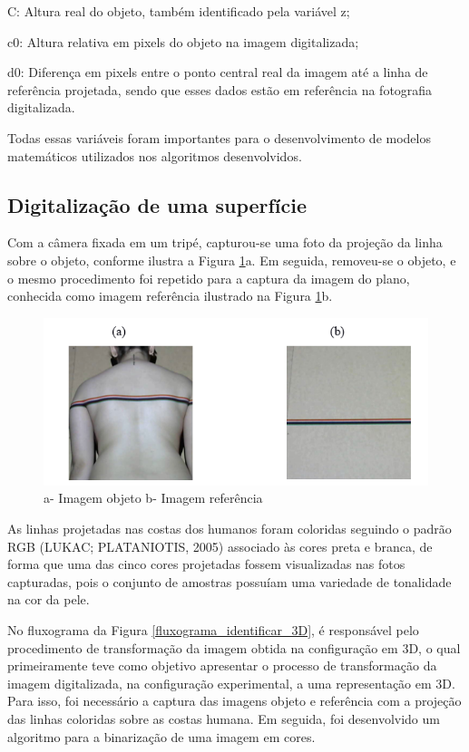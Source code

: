 \documentclass[a4paper, 12pt]{article}
\begin{document}
C: Altura real do objeto, também identificado pela variável z;

c0: Altura relativa em pixels do objeto na imagem digitalizada;

d0: Diferença em pixels entre o ponto central real da imagem até a linha de referência projetada, sendo que esses dados estão em referência na fotografia digitalizada. 
 
Todas essas variáveis foram importantes para o desenvolvimento de modelos matemáticos utilizados nos algoritmos desenvolvidos. 

\subsection{Digitalização de uma superfície}

Com a câmera fixada em um tripé, capturou-se uma foto da projeção da linha sobre o objeto, conforme ilustra a Figura \ref{imagem_projecao_colorida}a. Em seguida, removeu-se o objeto, e o mesmo procedimento foi repetido para a captura da imagem do plano, conhecida como imagem referência ilustrado na Figura \ref{imagem_projecao_colorida}b. 

\begin{figure}[H]
	\centering
		\includegraphics[width=.55\linewidth]{imagem_projecao_colorida.png}
	\caption{a- Imagem objeto b- Imagem referência}
	\label{imagem_projecao_colorida}
\end{figure}

As linhas projetadas nas costas dos humanos foram coloridas seguindo o padrão RGB (LUKAC; PLATANIOTIS, 2005) associado às cores preta e branca, de forma que uma das cinco cores projetadas fossem visualizadas nas fotos capturadas, pois o conjunto de amostras possuíam uma variedade de tonalidade na cor da pele.

No fluxograma da Figura \ref{fluxograma_identificar_3D}, é responsável pelo procedimento de transformação da imagem obtida na configuração em 3D, o qual primeiramente teve como objetivo apresentar o processo de transformação da imagem digitalizada, na configuração experimental, a uma representação em 3D. Para isso, foi necessário a captura das imagens objeto e referência com a projeção das linhas coloridas sobre as costas humana. Em seguida, foi desenvolvido um algoritmo para a binarização de uma imagem em cores.
\end{document}

